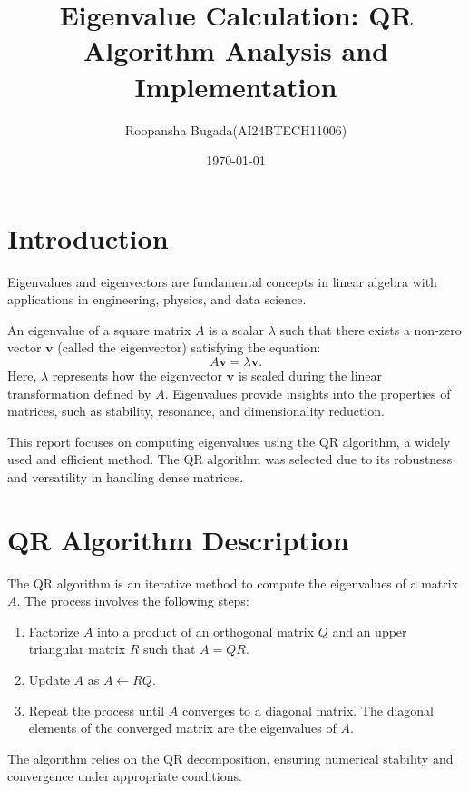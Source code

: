 \documentclass[12pt]{article}
\title{Eigenvalue Calculation: QR Algorithm Analysis and Implementation}
\author{Roopansha Bugada(AI24BTECH11006)}
\date{\today}
\begin{document}
\maketitle

\section{Introduction}
Eigenvalues and eigenvectors are fundamental concepts in linear algebra with applications in engineering, physics, and data science. 

An eigenvalue of a square matrix $A$ is a scalar $\lambda$ such that there exists a non-zero vector $\mathbf{v}$ (called the eigenvector) satisfying the equation:
\[
A \mathbf{v} = \lambda \mathbf{v}.
\]
Here, $\lambda$ represents how the eigenvector $\mathbf{v}$ is scaled during the linear transformation defined by $A$. Eigenvalues provide insights into the properties of matrices, such as stability, resonance, and dimensionality reduction.

This report focuses on computing eigenvalues using the QR algorithm, a widely used and efficient method. The QR algorithm was selected due to its robustness and versatility in handling dense matrices.

\section{QR Algorithm Description}
The QR algorithm is an iterative method to compute the eigenvalues of a matrix $A$. The process involves the following steps:
\begin{enumerate}
    \item Factorize $A$ into a product of an orthogonal matrix $Q$ and an upper triangular matrix $R$ such that $A = QR$.
    \item Update $A$ as $A \gets RQ$.
    \item Repeat the process until $A$ converges to a diagonal matrix. The diagonal elements of the converged matrix are the eigenvalues of $A$.
\end{enumerate}

The algorithm relies on the QR decomposition, ensuring numerical stability and convergence under appropriate conditions.
\end{document}
